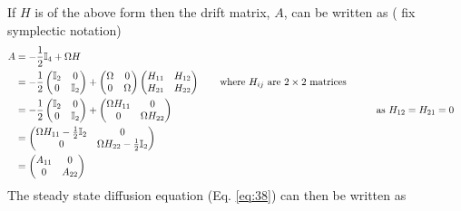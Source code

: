 \documentclass[11pt,a4paper]{article}
\numberwithin{equation}{section}
\begin{document}
	If $H$ is of the above form then the drift matrix, $A$, can be written as (\color{red} fix symplectic notation\color{black})
	\begin{align*}
	A &= -\frac{1}{2}\mathbb{I}_4 + \Omega H&\\
	 &= -\frac{1}{2} \begin{pmatrix}
	 \mathbb{I}_2 & 0  \\
	 0 & \mathbb{I}_2\\
	 \end{pmatrix} +  \begin{pmatrix}
	 \Omega & 0  \\
	 0 & \Omega\\
	 \end{pmatrix}
	 \begin{pmatrix}
	 H_{11} & H_{12}  \\
	 H_{21} & H_{22}\\
	 \end{pmatrix} \tag*{where $H_{ij}$ are $2 \times 2$ matrices}&\\
	  &=  -\frac{1}{2} \begin{pmatrix}
	  \mathbb{I}_2 & 0  \\
	  0 & \mathbb{I}_2\\
	  \end{pmatrix} +  \begin{pmatrix}
	  \Omega H_{11} & 0  \\
	  0 & \Omega H_{22}\\
	  \end{pmatrix}&\tag*{as $H_{12} = H_{21} = 0$}&\\
	  &= \begin{pmatrix}
	  \Omega H_{11} -\frac{1}{2}\mathbb{I}_2 & 0  \\
	  0 & \Omega H_{22}-\frac{1}{2}\mathbb{I}_2\\
	  \end{pmatrix}&\\
	  &= \begin{pmatrix}
	  A_{11} & 0  \\
	  0 & A_{22}\\
	  \end{pmatrix}&
	\end{align*}
	The steady state diffusion equation (Eq. \ref{eq:38}) can then be written as
\end{document}
